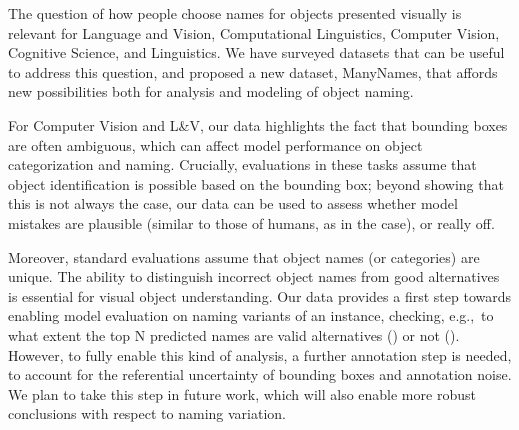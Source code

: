 
The question of how people choose names for objects presented visually is relevant for Language and Vision, Computational Linguistics, Computer Vision, Cognitive Science, and Linguistics.
We have surveyed datasets that can be useful to address this question, and proposed a new dataset, ManyNames, that affords new possibilities both for analysis and modeling of object naming.

For Computer Vision and L\&V, our data highlights the fact that bounding boxes are often ambiguous, which can affect model performance on object categorization and naming.
Crucially, evaluations in these tasks assume that object identification is possible based on the bounding box; beyond showing that this is not always the case, our data can be used to assess whether model mistakes are plausible (similar to those of humans, as in the  case), or really off.

Moreover, standard evaluations assume that object names (or categories) are unique.
The ability to distinguish incorrect object names from good alternatives is essential for visual object understanding.
Our data provides a first step towards enabling model evaluation on naming variants of an instance, checking, e.g.,\ to what extent the top N predicted names are valid alternatives () or not ().
However, to fully enable this kind of analysis, a further annotation step is needed, to account for the referential uncertainty of bounding boxes and annotation noise.
We plan to take this step in future work, which will also enable more robust conclusions with respect to naming variation.

